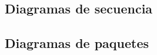 \documentclass[titlepage,a4paper]{article}
\begin{document}
	\subsection{Diagramas de secuencia}\label{sec:diagramasdesecuencia}

	\subsection{Diagramas de paquetes}\label{sec:diagramasdepaquetes}
\end{document}
